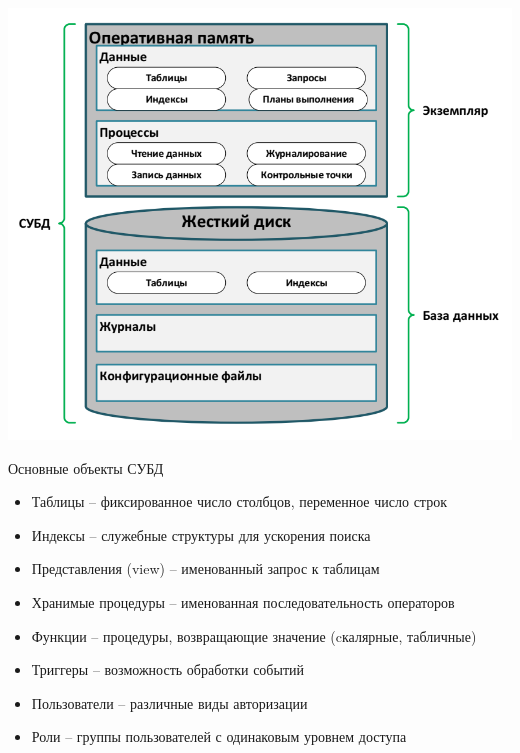 \documentclass{beamer}
\begin{document}
\begin{frame}
	\begin{center}
		\includegraphics[scale=0.4]{images/dbms.png}
	\end{center}
\end{frame} 

\begin{frame}{Основные объекты СУБД}
	\begin{itemize}
		\item Таблицы – фиксированное число столбцов, переменное число строк
		\item Индексы – служебные структуры для ускорения поиска
		\item Представления (view) – именованный запрос к таблицам
		\item Хранимые процедуры – именованная последовательность операторов
		\item Функции – процедуры, возвращающие значение (cкалярные, табличные)
		\item Триггеры – возможность обработки событий
		\item Пользователи – различные виды авторизации
		\item Роли – группы пользователей с одинаковым уровнем доступа
	\end{itemize}
\end{frame} 
\end{document}
